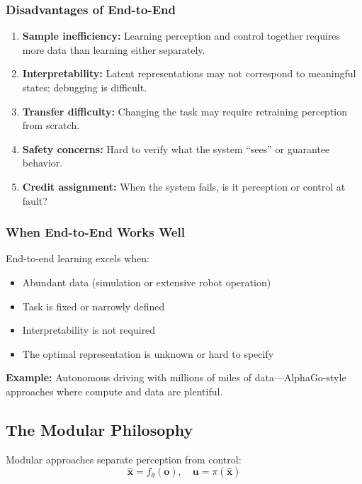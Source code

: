 \subsubsection{Disadvantages of End-to-End}

\begin{enumerate}
    \item \textbf{Sample inefficiency:} Learning perception and control together requires more data than learning either separately.

    \item \textbf{Interpretability:} Latent representations may not correspond to meaningful states; debugging is difficult.

    \item \textbf{Transfer difficulty:} Changing the task may require retraining perception from scratch.

    \item \textbf{Safety concerns:} Hard to verify what the system ``sees'' or guarantee behavior.

    \item \textbf{Credit assignment:} When the system fails, is it perception or control at fault?
\end{enumerate}

\subsubsection{When End-to-End Works Well}

End-to-end learning excels when:
\begin{itemize}
    \item Abundant data (simulation or extensive robot operation)
    \item Task is fixed or narrowly defined
    \item Interpretability is not required
    \item The optimal representation is unknown or hard to specify
\end{itemize}

\textbf{Example:} Autonomous driving with millions of miles of data---AlphaGo-style approaches where compute and data are plentiful.

\subsection{The Modular Philosophy}

Modular approaches separate perception from control:
\begin{equation}
\hat{\mathbf{x}} = f_\theta(\mathbf{o}), \quad \mathbf{u} = \pi(\hat{\mathbf{x}})
\label{eq:modular}
\end{equation}

